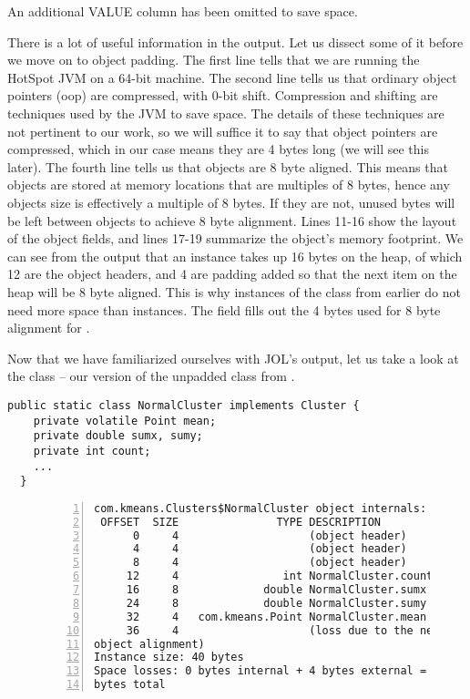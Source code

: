 An additional VALUE column has been omitted to save space.

There is a lot of useful information in the output. Let us dissect some of it
before we move on to object padding.
The first line tells that we are running the HotSpot JVM on a 64-bit machine.
The second line tells us that ordinary object pointers (oop) are compressed,
with 0-bit shift. Compression and shifting are techniques used by the JVM to
save space. The details of these techniques are not pertinent to our work, so we will suffice
it to say that object pointers are compressed, which in our case means they are 4 bytes long (we will see this later).
The fourth line tells us that objects are 8 byte aligned. This means that
objects are stored at memory locations that are multiples of 8 bytes, hence any
objects size is effectively a multiple of 8 bytes. If they are not, unused
bytes will be left between objects to achieve 8 byte alignment. Lines 11-16 show
the layout of the object fields, and lines 17-19 summarize the object's memory
footprint. We can see from the output that an  instance takes up 16
bytes on the heap, of which 12 are the object headers, and 4 are padding added
so that the next item on the heap will be 8 byte aligned. This is why instances
of the  class from earlier do not need more space than
 instances. The  field fills out the 4 bytes used for 8 byte
alignment for .

Now that we have familiarized ourselves with JOL's output, let us take a look at
the  class -- our version of the unpadded 
class from \cite{mystery}.

\begin{code}
\begin{Verbatim}[frame=single]
  public static class NormalCluster implements Cluster {
    private volatile Point mean;
    private double sumx, sumy;
    private int count;
    ...
  }
\end{Verbatim}
	\caption{The fields of the  class}
	\label{code:normalcluster}
\end{code}

\begin{figure}[h]
\begin{Verbatim}[frame=single, numbers=left]
com.kmeans.Clusters$NormalCluster object internals:
 OFFSET  SIZE               TYPE DESCRIPTION
      0     4                    (object header)
      4     4                    (object header)
      8     4                    (object header)
     12     4                int NormalCluster.count
     16     8             double NormalCluster.sumx
     24     8             double NormalCluster.sumy
     32     4   com.kmeans.Point NormalCluster.mean
     36     4                    (loss due to the next
object alignment)
Instance size: 40 bytes
Space losses: 0 bytes internal + 4 bytes external = 4
bytes total
\end{Verbatim}
\end{figure}

